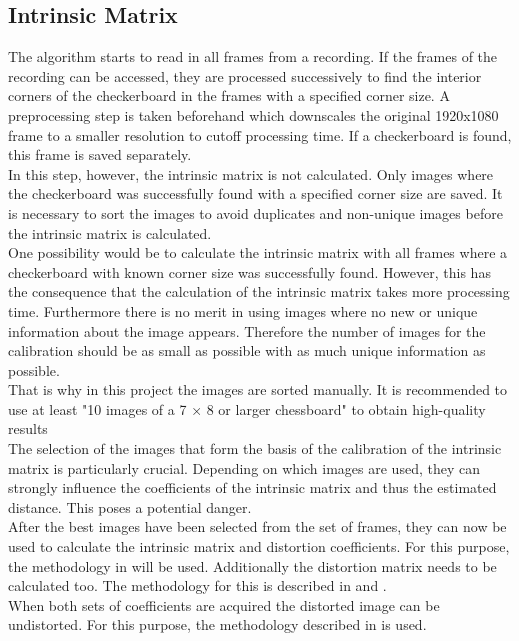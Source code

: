\subsection{Intrinsic Matrix}

The algorithm starts to read in all frames from a recording. If the frames of the recording can be accessed, they are processed successively to find the interior corners of the checkerboard in the frames with a specified corner size. A preprocessing step is taken beforehand which downscales the original 1920x1080 frame to a smaller resolution to cutoff processing time. If a checkerboard is found, this frame is saved separately.\\

In this step, however, the intrinsic matrix is not calculated. Only images where the checkerboard was successfully found with a specified corner size are saved. It is necessary to sort the images to avoid duplicates and non-unique images before the intrinsic matrix is calculated.\\

One possibility would be to calculate the intrinsic matrix with all frames where a checkerboard with known corner size was successfully found. However, this has the consequence that the calculation of the intrinsic matrix takes more processing time. Furthermore there is no merit in using images where no new or unique information about the image appears. Therefore the number of images for the calibration should be as small as possible with as much unique information as possible.\\
That is why in this project the images are sorted manually. It is recommended to use at least "10 images of a 7 × 8 or larger chessboard" \cite{cv} to obtain high-quality results \cite{cv}\\

The selection of the images that form the basis of the calibration of the intrinsic matrix is particularly crucial. Depending on which images are used, they can strongly influence the coefficients of the intrinsic matrix and thus the estimated distance. This poses a potential danger.\\ %

After the best images have been selected from the set of frames, they can now be used to calculate the intrinsic matrix and distortion coefficients. For this purpose, the methodology in \cite{zhang2000} will be used. Additionally the distortion matrix needs to be calculated too. The methodology for this is described in \cite{brown} and \cite{brown_2}. \cite{cv}\\
When both sets of coefficients are acquired the distorted image can be undistorted. For this purpose, the methodology described in \cite{distort_cv} is used.\\

